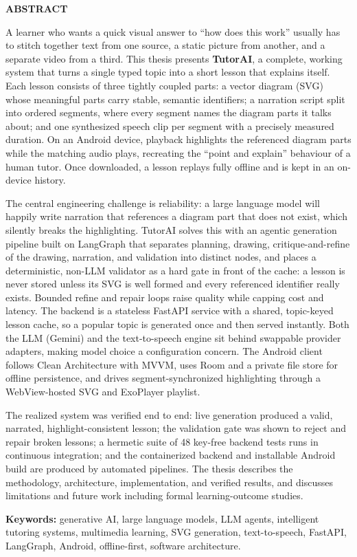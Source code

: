 \clearpage
\thispagestyle{plain}
\begin{center}
{\Large\bfseries ABSTRACT\par}
\end{center}
\vspace{4mm}

A learner who wants a quick visual answer to ``how does this work'' usually has
to stitch together text from one source, a static picture from another, and a
separate video from a third. This thesis presents \textbf{TutorAI}, a complete,
working system that turns a single typed topic into a short lesson that
explains itself. Each lesson consists of three tightly coupled parts: a vector
diagram (SVG) whose meaningful parts carry stable, semantic identifiers; a
narration script split into ordered segments, where every segment names the
diagram parts it talks about; and one synthesized speech clip per segment with
a precisely measured duration. On an Android device, playback highlights the
referenced diagram parts while the matching audio plays, recreating the
``point and explain'' behaviour of a human tutor. Once downloaded, a lesson
replays fully offline and is kept in an on-device history.

The central engineering challenge is reliability: a large language model will
happily write narration that references a diagram part that does not exist,
which silently breaks the highlighting. TutorAI solves this with an agentic
generation pipeline built on LangGraph that separates planning, drawing,
critique-and-refine of the drawing, narration, and validation into distinct
nodes, and places a deterministic, non-LLM validator as a hard gate in front
of the cache: a lesson is never stored unless its SVG is well formed and every
referenced identifier really exists. Bounded refine and repair loops raise
quality while capping cost and latency. The backend is a stateless FastAPI
service with a shared, topic-keyed lesson cache, so a popular topic is
generated once and then served instantly. Both the LLM (Gemini) and the
text-to-speech engine sit behind swappable provider adapters, making model
choice a configuration concern. The Android client follows Clean Architecture
with MVVM, uses Room and a private file store for offline persistence, and
drives segment-synchronized highlighting through a WebView-hosted SVG and
ExoPlayer playlist.

The realized system was verified end to end: live generation produced a valid,
narrated, highlight-consistent lesson; the validation gate was shown to reject
and repair broken lessons; a hermetic suite of 48 key-free backend tests runs
in continuous integration; and the containerized backend and installable
Android build are produced by automated pipelines. The thesis describes the
methodology, architecture, implementation, and verified results, and discusses
limitations and future work including formal learning-outcome studies.

\vspace{6mm}
\noindent\textbf{Keywords:} generative AI, large language models, LLM agents,
intelligent tutoring systems, multimedia learning, SVG generation,
text-to-speech, FastAPI, LangGraph, Android, offline-first, software
architecture.
